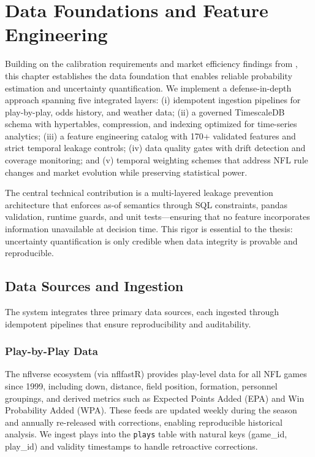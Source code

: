 \chapter{Data Foundations and Feature Engineering}
\label{chap:data}

Building on the calibration requirements and market efficiency findings from , this chapter establishes the data foundation that enables reliable probability estimation and uncertainty quantification. We implement a defense-in-depth approach spanning five integrated layers: (i) idempotent ingestion pipelines for play-by-play, odds history, and weather data; (ii) a governed TimescaleDB schema with hypertables, compression, and indexing optimized for time-series analytics; (iii) a feature engineering catalog with 170+ validated features and strict temporal leakage controls; (iv) data quality gates with drift detection and coverage monitoring; and (v) temporal weighting schemes that address NFL rule changes and market evolution while preserving statistical power.

The central technical contribution is a multi-layered leakage prevention architecture that enforces as-of semantics through SQL constraints, pandas validation, runtime guards, and unit tests---ensuring that no feature incorporates information unavailable at decision time. This rigor is essential to the thesis: uncertainty quantification is only credible when data integrity is provable and reproducible.



\section{Data Sources and Ingestion}
\label{sec:ingestion}

The system integrates three primary data sources, each ingested through idempotent pipelines that ensure reproducibility and auditability.

\subsection{Play-by-Play Data}
The nflverse ecosystem (via nflfastR) provides play-level data for all NFL games since 1999, including down, distance, field position, formation, personnel groupings, and derived metrics such as Expected Points Added (EPA) and Win Probability Added (WPA). These feeds are updated weekly during the season and annually re-released with corrections, enabling reproducible historical analysis. We ingest plays into the \texttt{plays} table with natural keys (game\_id, play\_id) and validity timestamps to handle retroactive corrections.

